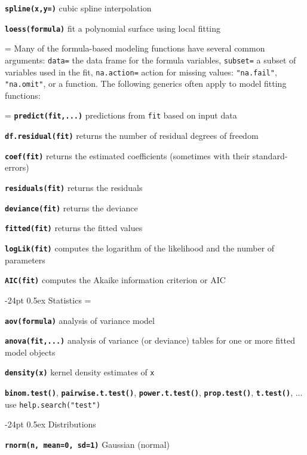 \documentclass[10pt,landscape]{article}
\makeatletter
\renewcommand\section{\@startsection{section}{1}{0mm}%
                                     {-24pt}%
                                     {0.5ex}%
                                {\color{blue}\normalfont\large\bfseries}}
\newcommand{\code}{\texttt}
\newcommand{\bcode}[1]{\texttt{\textbf{#1}}}
\makeatother
\begin{document}
\begin{multicols*}{3}
\bcode{spline(x,y=)} cubic spline interpolation

\bcode{loess(formula)} fit a polynomial surface using local fitting

\everypar={\hangindent=0mm}
Many of the formula-based modeling functions have several common
arguments: \code{data=} the data frame for the formula variables,
\code{subset=} a subset of variables used in the fit,
\code{na.action=} action for missing values: \code{"na.fail"}, \code{"na.omit"}, or
a function. The following generics often apply to model fitting functions: 

\everypar={\hangindent=9mm}
\bcode{predict(fit,...)}  predictions from \code{fit} based on input data

\bcode{df.residual(fit)}  returns the number of residual degrees of freedom

\bcode{coef(fit)}  returns the estimated coefficients (sometimes with their standard-errors)

\bcode{residuals(fit)}  returns the residuals

\bcode{deviance(fit)}  returns the deviance

\bcode{fitted(fit)}  returns the fitted values

\bcode{logLik(fit)}  computes the logarithm of the likelihood and the number of parameters

\bcode{AIC(fit)}  computes the Akaike information criterion or AIC


\section{Statistics}
\everypar={\hangindent=9mm}

\bcode{aov(formula)} analysis of variance model

\bcode{anova(fit,...)} analysis of variance (or deviance) tables for one or more
     fitted model objects

\bcode{density(x)} kernel density estimates of \code{x}

\bcode{binom.test()}, \bcode{pairwise.t.test()}, \bcode{power.t.test()},
\bcode{prop.test()}, \bcode{t.test()}, ... use
\code{help.search("test")} 





\section{Distributions}

\bcode{rnorm(n, mean=0, sd=1)} Gaussian (normal)  


\end{multicols*}
\end{document}
